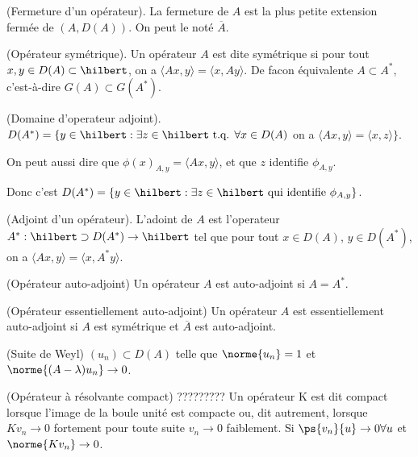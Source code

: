\begin{defi}
    (Fermeture d'un opérateur).
    La fermeture de $A$ est la plus petite extension fermée de $(A, D(A))$.
    On peut le noté $\overline A$.
\end{defi}

\begin{defi}
    (Opérateur symétrique).
    Un opérateur $A$ est dite symétrique si pour tout $x, y \in D(A) \subset \hilbert$,
    on a $\langle Ax, y \rangle = \langle x, Ay \rangle$. De facon équivalente
    $A \subset A^*$, c'est-à-dire $G(A) \subset G(A^*)$.
\end{defi}

\begin{defi}
    (Domaine d'operateur adjoint). $D(A^*) = \{ y \in \hilbert : \exists z \in \hilbert
    \text{ t.q. } \forall x \in D(A)$ on a
    $\langle Ax, y \rangle = \langle x, z \rangle \}$.

    On peut aussi dire
    que $\phi(x)_{A,y} = \langle Ax, y \rangle$, et que $z$ identifie $\phi_{A,y}$.

    Donc c'est $D(A^*) = \{ y \in \hilbert : \exists z \in \hilbert
    \text{ qui identifie } \phi_{A,y} \}$.

\end{defi}

\begin{defi}
    (Adjoint d'un opérateur). L'adoint de $A$ est l'operateur
    $A^* : \hilbert \supset D(A^*) \rightarrow \hilbert$ tel que pour tout
    $x \in D(A)$, $y \in D(A^*)$, on a
    $\langle Ax, y \rangle = \langle x, A^* y \rangle$.
\end{defi}

\begin{defi}
    (Opérateur auto-adjoint)
    Un opérateur $A$ est auto-adjoint si $A = A^*$.
\end{defi}


\begin{defi}
    (Opérateur essentiellement auto-adjoint)
    Un opérateur $A$ est essentiellement auto-adjoint si $A$ est
    symétrique et $\overline A$ est auto-adjoint.
\end{defi}


\begin{defi}
    (Suite de Weyl)
    $(u_n) \subset D(A)$ telle que $\norme{u_n} = 1$ et
    $\norme{(A - \lambda) u_n} \rightarrow 0$.
\end{defi}


\begin{defi}
    (Opérateur à résolvante compact)
    ?????????
    Un opérateur K est dit compact lorsque l’image de la boule unité est
    compacte ou, dit autrement, lorsque $Kv_n \to 0$ fortement pour toute
    suite $v_n \to 0$ faiblement.
    Si $\ps{v_n}{u} \to 0 \forall u$ et $\norme{Kv_n} \to 0$.
\end{defi}

